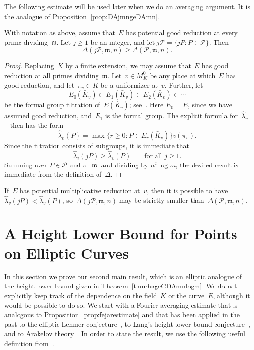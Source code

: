The following estimate will be used later when we do an averaging
argument. It is the analogue of Proposition~\ref{prop:DAjmngeDAmn}.

\begin{lemma}
\label{lemma:DjPgeDP}
With notation as above, assume that~$E$ has potential good reduction
at every prime dividing~${{\mathfrak{m}}}$.  Let $j\ge1$ be an integer, and let
$j{{\mathcal P}}=\{jP:P\in{{\mathcal P}}\}$. Then
\[
  \Delta(j{{\mathcal P}},{{\mathfrak{m}}},n)\ge \Delta({{\mathcal P}},{{\mathfrak{m}}}, n).
\]
\end{lemma}
\begin{proof}
Replacing~$K$ by a finite extension, we may assume that~$E$ has good
reduction at all primes dividing~${{\mathfrak{m}}}$.  Let~$v\in M_K^0$ be any place
at which~$E$ has good reduction, and let~$\pi_v\in K$ be a uniformizer
at~$v$. Further, let
\[
  E_0({{\bar K}}_v) \subset E_1({{\bar K}}_v) \subset E_2({{\bar K}}_v) \subset \cdots
\]
be the formal group filtration of~$E({{\bar K}}_v)$;
see~\cite[Chapters~IV,~VII]{MR2514094}. Here $E_0=E$, since we have assumed
good reduction, and~$E_1$ is the formal group.  The explicit formula
for~${\hat\lambda}_v$~\cite[Theorem~VI.4.1]{ATAEC} then has the form
\[
  {\hat\lambda}_v(P) = \max\bigl\{r\ge0 : P \in E_r({{\bar K}}_v)\bigr\}v(\pi_v).
\]
Since the filtration consists of subgroups, it is immediate that
\[
  {\hat\lambda}_v(jP) \ge {\hat\lambda}_v(P)
  \qquad\text{for all $j\ge1$.}
\]
Summing over $P\in{{\mathcal P}}$ and $v\mid{{\mathfrak{m}}}$, and dividing by $n^2\log m$,
the desired result is immediate from the definition of~${\Delta}$.  
\end{proof}

\begin{remark}
If~$E$ has potential multiplicative reduction at~$v$, then it is
possible to have ${\hat\lambda}_v(jP)<{\hat\lambda}_v(P)$, so~${\Delta}(j{{\mathcal P}},{{\mathfrak{m}}},n)$ may
be strictly smaller than~${\Delta}({{\mathcal P}},{{\mathfrak{m}}},n)$.
\end{remark}

\section{A Height Lower Bound for Points on Elliptic Curves}
\label{section:mainresult}

In this section we prove our second main result, which is an elliptic
analogue of the height lower bound given in
Theorem~\ref{thm:hageCDAmnlogm}.  We do not explicitly keep track of
the dependence on the field~$K$ or the curve~$E$, although it would be
possible to do so.  We start with a Fourier averaging estimate that is
analogous to Proposition~\ref{prop:fejarestimate} and that has been
applied in the past to the elliptic Lehmer conjecture~\cite{HiSi1}, to
Lang's height lower bound conjecture~\cite{HiSi2}, and to Arakelov
theory~\cite{LangAT}.  In order to state the result, we use the
following useful definition from~\cite{LangDG}.

